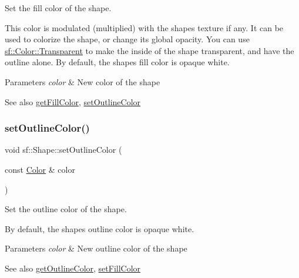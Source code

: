 Set the fill color of the shape. 

This color is modulated (multiplied) with the shape\textquotesingle{}s texture if any. It can be used to colorize the shape, or change its global opacity. You can use \hyperlink{classsf_1_1_color_a569b45471737f770656f50ae7bbac292}{sf\+::\+Color\+::\+Transparent} to make the inside of the shape transparent, and have the outline alone. By default, the shape\textquotesingle{}s fill color is opaque white.


\begin{DoxyParams}{Parameters}
{\em color} & New color of the shape\\
\hline
\end{DoxyParams}
\begin{DoxySeeAlso}{See also}
\hyperlink{classsf_1_1_shape_ae3030128824e687f259d18addcf33528}{get\+Fill\+Color}, \hyperlink{classsf_1_1_shape_a5978f41ee349ac3c52942996dcb184f7}{set\+Outline\+Color} 
\end{DoxySeeAlso}
\mbox{\label{classsf_1_1_shape_a5978f41ee349ac3c52942996dcb184f7}} 
\subsubsection{\texorpdfstring{set\+Outline\+Color()}{setOutlineColor()}}
{\footnotesize\ttfamily void sf\+::\+Shape\+::set\+Outline\+Color (\begin{DoxyParamCaption}\item[{const \hyperlink{classsf_1_1_color}{Color} \&}]{color }\end{DoxyParamCaption})}



Set the outline color of the shape. 

By default, the shape\textquotesingle{}s outline color is opaque white.


\begin{DoxyParams}{Parameters}
{\em color} & New outline color of the shape\\
\hline
\end{DoxyParams}
\begin{DoxySeeAlso}{See also}
\hyperlink{classsf_1_1_shape_a6598feed5fea1325a36b0f3a615ac55c}{get\+Outline\+Color}, \hyperlink{classsf_1_1_shape_a3506f9b5d916fec14d583d16f23c2485}{set\+Fill\+Color} 
\end{DoxySeeAlso}
\mbox{\label{classsf_1_1_shape_a5ad336ad74fc1f567fce3b7e44cf87dc}} 
